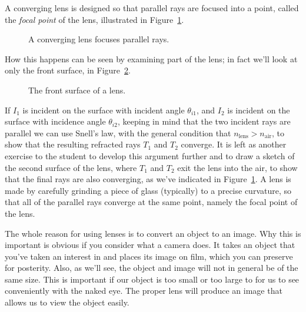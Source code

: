 A converging lens is designed so that parallel rays are focused into a point, 
called the {\it focal point} of the lens, illustrated in 
Figure~\ref{fig:opt:focalpt}.
\begin{figure}[htb]
\centerline{\epsfxsize=8cm }
\caption{A converging lens focuses parallel rays.}
\label{fig:opt:focalpt}
\end{figure}
How this happens can be seen by examining part of the lens; in fact we'll look
at only the front surface, in Figure~\ref{fig:opt:frontsurf}.
\begin{figure}[htb]
\centerline{\epsfxsize=8cm }
\caption{The front surface of a lens.}
\label{fig:opt:frontsurf}
\end{figure}
If $I_1$ is incident on the surface with incident angle $\theta_{i1}$, and  $I_2$ is incident on the surface with incidence angle $\theta_{i2}$, keeping in mind that the two incident rays are parallel we can use Snell's law, with the general condition that $n_{\mbox{lens}}>n_{\mbox{air}}$, to show that
the resulting refracted rays $T_1$ and $T_2$ converge.  It is left as another exercise to the 
student to develop this argument further and to draw a sketch of the second
surface of the lens, where $T_1$ and $T_2$ exit the lens into the air, to 
show that the final rays are also converging, as we've indicated in 
Figure~\ref{fig:opt:focalpt}. A lens is made by carefully grinding a piece of
glass (typically) to a precise curvature, so that all of the parallel rays
converge at the same point, namely the focal point of the lens.

The whole reason for using lenses is to convert an object to an image. Why 
this is important is obvious if you consider what a camera does. It takes an 
object that you've taken an interest in and places its image on film, which 
you can preserve for posterity.  Also, as we'll see, the object and image will 
not in general be of the same size. This is important if our object is too 
small or too large to for us to see conveniently with the naked eye.  The 
proper lens will produce an image that allows us to view the object easily. 

